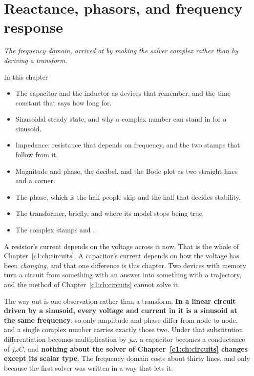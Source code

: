 
\chapter{Reactance, phasors, and frequency response}
\label{c2:ch:reactance}

{\large\itshape The frequency domain, arrived at by making the solver complex rather than by
deriving a transform.\par}

\begin{chapterbox}{In this chapter}
\begin{itemize}
  \item The capacitor and the inductor as devices that remember, and the time constant that says
    how long for.
  \item Sinusoidal steady state, and why a complex number can stand in for a sinusoid.
  \item Impedance: resistance that depends on frequency, and the two stamps that follow from it.
  \item Magnitude and phase, the decibel, and the Bode plot as two straight lines and a corner.
  \item The phase, which is the half people skip and the half that decides stability.
  \item The transformer, briefly, and where its model stops being true.
  \item The complex stamps and .
\end{itemize}
\end{chapterbox}

A resistor's current depends on the voltage across it now. That is the whole of
Chapter~\ref{c1:ch:circuits}. A capacitor's current depends on how the voltage has been
\emph{changing}, and that one difference is this chapter. Two devices with memory turn a circuit
from something with an answer into something with a trajectory, and the method of
Chapter~\ref{c1:ch:circuits} cannot solve it.

The way out is one observation rather than a transform. \textbf{In a linear circuit driven by a
sinusoid, every voltage and current in it is a sinusoid at the same frequency}, so only amplitude
and phase differ from node to node, and a single complex number carries exactly those two. Under
that substitution differentiation becomes multiplication by $j\omega$, a capacitor becomes a
conductance of $j\omega C$, and \textbf{nothing about the solver of Chapter~\ref{c1:ch:circuits}
changes except its scalar type}. The frequency domain costs about thirty lines, and only because
the first solver was written in a way that lets it.

